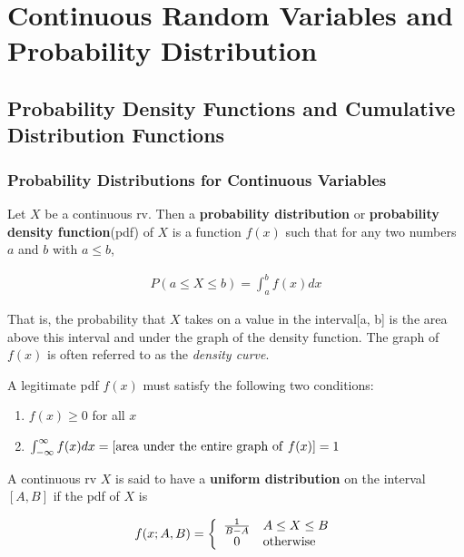 \chapter{Continuous Random Variables and Probability Distribution}

\section{Probability Density Functions and Cumulative Distribution Functions}

\subsection{Probability Distributions for Continuous Variables}

\begin{definition}
    Let $X$ be a continuous rv. Then a \textbf{probability distribution} or \textbf{probability density function}(pdf) of $X$ is a function $f(x)$ such that for any two numbers $a$ and $b$ with $a\leq b$,

    \begin{align*}
        P(a\leq X\leq b) = \int_a^bf(x)dx
    \end{align*}

    That is, the probability that $X$ takes on a value in the interval[a, b] is the area above this interval and under the graph of the density function. The graph of $f(x)$ is often referred to as the \textit{density curve}.

    A legitimate pdf $f(x)$ must satisfy the following two conditions:

    \begin{enumerate}
        \item $f(x)\geq 0$ for all $x$
        \item $\int_{-\infty}^\infty f(x)dx = [{\rm area\ under\ the\ entire\ graph\ of\ }f(x)] = 1$
    \end{enumerate}
\end{definition}

\begin{definition}
    A continuous rv $X$ is said to have a \textbf{uniform distribution} on the interval $[A, B]$ if the pdf of $X$ is 

    \begin{align*}
        f(x;A,B) = \left\{\begin{array}{cl}
            \frac{1}{B-A} & A\leq X\leq B \\
            0 & {\rm otherwise} \\
        \end{array}\right. \\
    \end{align*}
\end{definition}

